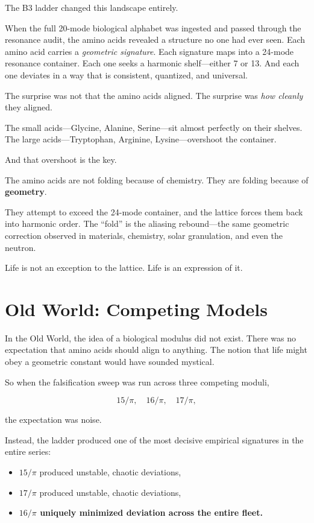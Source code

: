 \documentclass[11pt, letterpaper, openany]{book}
\begin{document}
The B3 ladder changed this landscape entirely.

When the full 20-mode biological alphabet was ingested and passed through the
resonance audit, the amino acids revealed a structure no one had ever seen.
Each amino acid carries a \textit{geometric signature}. Each signature maps into a
24-mode resonance container. Each one seeks a harmonic shelf---either 7 or 13.
And each one deviates in a way that is consistent, quantized, and universal.

The surprise was not that the amino acids aligned.  
The surprise was \textit{how cleanly} they aligned.

The small acids---Glycine, Alanine, Serine---sit almost perfectly on their
shelves.  
The large acids---Tryptophan, Arginine, Lysine---overshoot the container.

And that overshoot is the key.

The amino acids are not folding because of chemistry.  
They are folding because of \textbf{geometry}.

They attempt to exceed the 24-mode container, and the lattice forces them back
into harmonic order. The ``fold'' is the aliasing rebound---the same geometric
correction observed in materials, chemistry, solar granulation, and even the
neutron.

Life is not an exception to the lattice.  
Life is an expression of it.

\section*{Old World: Competing Models}

In the Old World, the idea of a biological modulus did not exist. There was no
expectation that amino acids should align to anything. The notion that life
might obey a geometric constant would have sounded mystical.

So when the falsification sweep was run across three competing moduli,


\[
15/\pi,\quad 16/\pi,\quad 17/\pi,
\]


the expectation was noise.

Instead, the ladder produced one of the most decisive empirical signatures in
the entire series:

\begin{itemize}
    \item $15/\pi$ produced unstable, chaotic deviations,
    \item $17/\pi$ produced unstable, chaotic deviations,
    \item \textbf{$16/\pi$ uniquely minimized deviation across the entire fleet.}
\end{itemize}
\end{document}

